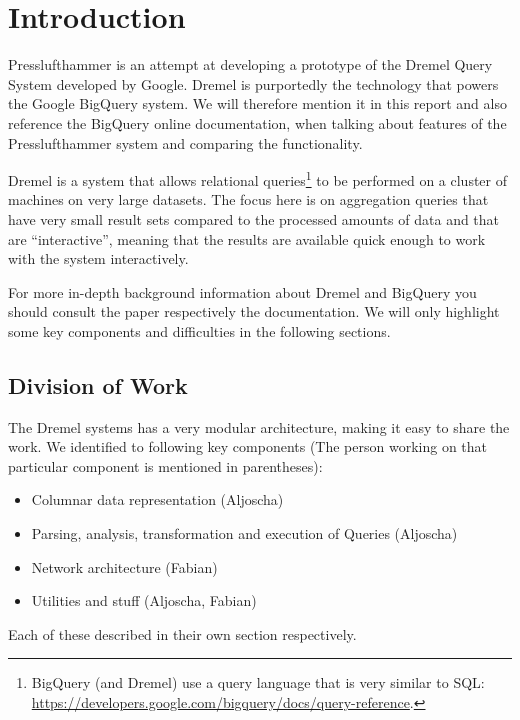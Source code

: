 
\section{Introduction}
Presslufthammer is an attempt at developing a prototype of the Dremel Query
System \cite{melnik2010dremel} developed by Google. Dremel is purportedly the
technology that powers the Google BigQuery \cite{bigquery} system. We will
therefore mention it in this report and also reference the BigQuery online
documentation, when talking about features of the Presslufthammer system
and comparing the functionality.

Dremel is a system that allows relational queries\footnote{BigQuery
(and Dremel) use a query language that is very similar to SQL: 
\url{https://developers.google.com/bigquery/docs/query-reference}.} to be
performed on a cluster of machines on very large datasets. The focus here
is on aggregation queries that have very small result sets compared to the
processed amounts of data and that are ``interactive'', meaning that the
results are available quick enough to work with the system interactively.

For more in-depth background information about Dremel and BigQuery you should
consult the paper respectively the documentation. We will only highlight
some key components and difficulties in the following sections.

\subsection{Division of Work}

The Dremel systems has a very modular architecture, making it easy to share the
work. We identified to following key components (The person working on that
particular component is mentioned in parentheses):

\begin{itemize}
  \item Columnar data representation (Aljoscha)
  \item Parsing, analysis, transformation and execution of Queries (Aljoscha)
  \item Network architecture (Fabian)
  \item Utilities and stuff (Aljoscha, Fabian)
\end{itemize}

Each of these described in their own section respectively.

